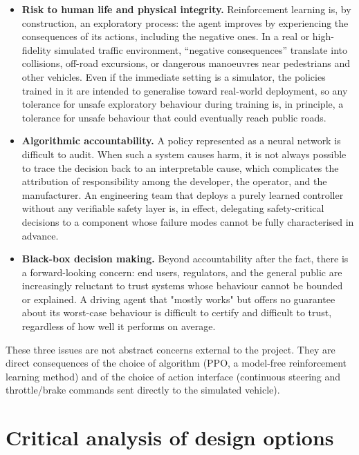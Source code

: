 \begin{itemize}
  \item \textbf{Risk to human life and physical integrity.} Reinforcement learning is, by
        construction, an exploratory process: the agent improves by experiencing the
        consequences of its actions, including the negative ones. In a real or
        high-fidelity simulated traffic environment, ``negative consequences'' translate
        into collisions, off-road excursions, or dangerous manoeuvres near pedestrians and
        other vehicles. Even if the immediate setting is a simulator, the policies trained
        in it are intended to generalise toward real-world deployment, so any tolerance for
        unsafe exploratory behaviour during training is, in principle, a tolerance for
        unsafe behaviour that could eventually reach public roads.

  \item \textbf{Algorithmic accountability.} A policy represented as a neural network is
        difficult to audit. When such a system causes harm, it is not always possible to
        trace the decision back to an interpretable cause, which complicates the
        attribution of responsibility among the developer, the operator, and the
        manufacturer. An engineering team that deploys a purely learned controller without
        any verifiable safety layer is, in effect, delegating safety-critical decisions to
        a component whose failure modes cannot be fully characterised in advance.

  \item \textbf{Black-box decision making.} Beyond accountability after the fact, there is
        a forward-looking concern: end users, regulators, and the general public are
        increasingly reluctant to trust systems whose behaviour cannot be bounded or
        explained. A driving agent that "mostly works" but offers no guarantee about its
        worst-case behaviour is difficult to certify and difficult to trust, regardless of
        how well it performs on average.
\end{itemize}

These three issues are not abstract concerns external to the project. They are direct
consequences of the choice of algorithm (PPO, a model-free reinforcement learning
method) and of the choice of action interface (continuous steering and throttle/brake
commands sent directly to the simulated vehicle).

\section{Critical analysis of design options}\label{sec:ethics-options}

